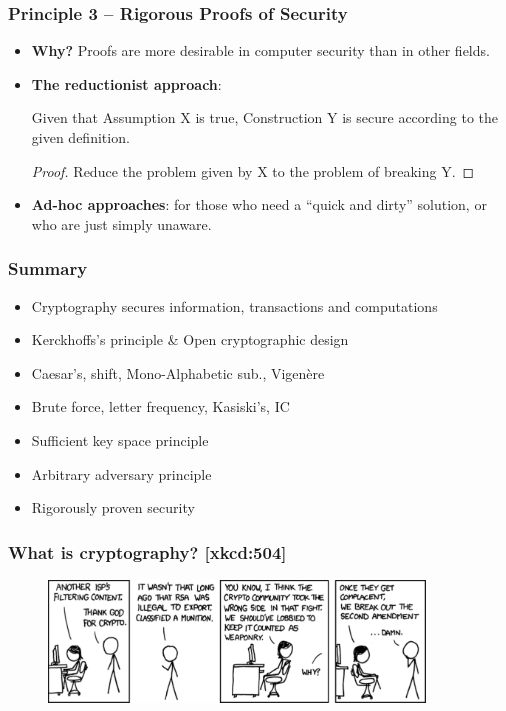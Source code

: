 \begin{frame}\frametitle{Principle 3 -- Rigorous Proofs of Security}
\begin{itemize}
\item \textbf{Why?} Proofs are more desirable in computer security than in other fields.
\item \textbf{The reductionist approach}: 
\begin{theorem}	Given that Assumption X is true, Construction Y is secure according to the given definition.
\end{theorem}
\begin{proof} Reduce the problem given by X to the problem of breaking Y.
\end{proof}
\item \textbf{Ad-hoc approaches}: for those who need a ``quick and dirty'' solution, or who are just simply unaware.
\end{itemize}
\end{frame}
\begin{frame}\frametitle{Summary}
\begin{itemize}
\item Cryptography secures information, transactions and computations
\item Kerckhoffs's principle \& Open cryptographic design
\item Caesar's, shift, Mono-Alphabetic sub., Vigen\`{e}re
\item Brute force, letter frequency, Kasiski's, IC
\item Sufficient key space principle
\item Arbitrary adversary principle
\item Rigorously proven security
\end{itemize}
\end{frame}
\begin{frame}\frametitle{What is cryptography? [xkcd:504]}
\begin{figure}
\begin{center}
\includegraphics[width=100mm]{pic/legal} 
\end{center}
\end{figure}
\end{frame}
